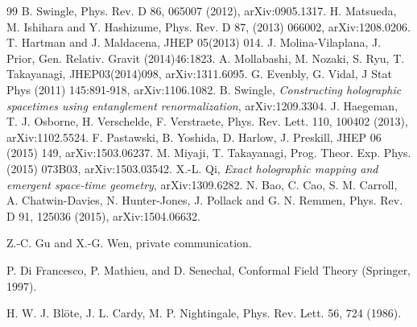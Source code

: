 \documentclass[aps,prl,twocolumn,showpacs,superscriptaddress,floatfix,10pt]{revtex4-1}
\begin{document}
\begin{thebibliography}{99}
B. Swingle, Phys. Rev. D 86, 065007 (2012), arXiv:0905.1317.
%
H. Matsueda, M. Ishihara and Y. Hashizume,  
Phys. Rev. D 87, (2013) 066002, arXiv:1208.0206.
%
T. Hartman and J. Maldacena, 
JHEP 05(2013) 014. %
%
J. Molina-Vilaplana, J. Prior, Gen. Relativ. Gravit (2014)46:1823.
%
A. Mollabashi, M. Nozaki, S. Ryu, T. Takayanagi,
JHEP03(2014)098, arXiv:1311.6095.
%
G. Evenbly, G. Vidal, 
J Stat Phys (2011) 145:891-918, arXiv:1106.1082. 
%
B. Swingle, 
\textit{Constructing holographic spacetimes using entanglement renormalization},
arXiv:1209.3304.
%
J. Haegeman, T. J. Osborne, H. Verschelde, F. Verstraete,  
Phys. Rev. Lett. 110, 100402 (2013), arXiv:1102.5524.
%
F. Pastawski, B. Yoshida, D. Harlow, J. Preskill, 
JHEP 06 (2015) 149, arXiv:1503.06237.
%
M. Miyaji, T. Takayanagi,
Prog. Theor. Exp. Phys. (2015) 073B03, arXiv:1503.03542.
% 
X.-L. Qi,
\textit{Exact holographic mapping and emergent space-time geometry},
arXiv:1309.6282.
%
N. Bao, C. Cao, S. M. Carroll, A. Chatwin-Davies, N. Hunter-Jones, J. Pollack and
G. N. Remmen, 
Phys. Rev. D 91, 125036 (2015), arXiv:1504.06632.

 Z.-C. Gu and X.-G. Wen, private communication.

 P. Di Francesco, P. Mathieu, and D. Senechal, Conformal
Field Theory (Springer, 1997).

 H. W. J. Bl\"{o}te, J. L. Cardy, M. P. Nightingale, Phys. Rev. Lett. 56, 724 (1986).

\end{thebibliography}

\end{document}
